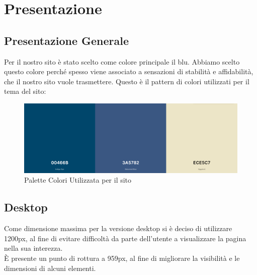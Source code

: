 \section{Presentazione}

  \subsection{Presentazione Generale}
    Per il nostro sito è stato scelto come colore principale il blu. Abbiamo scelto questo colore perché spesso viene associato a sensazioni di stabilità e affidabilità, che il nostro sito vuole trasmettere. 
    Questo è il pattern di colori utilizzati per il tema del sito:
    \begin{figure}[h]
      \includegraphics[scale=0.4]{Images/ColoriPaginaWeb.png}
      \caption{Palette Colori Utilizzata per il sito}
      \centering
    \end{figure}

  \subsection{Desktop}
    Come dimensione massima per la versione desktop si è deciso di utilizzare 1200px, al fine di evitare difficoltà da parte dell'utente a visualizzare la pagina nella sua interezza. \\
    È presente un punto di rottura a 959px, al fine di migliorare la visibilità e le dimensioni di alcuni elementi.

